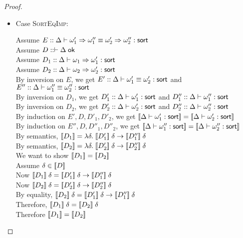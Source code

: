 \begin{proof}
\begin{itemize}
\item Case \textsc{SortEqImp}: 
  \begin{tabbedproof}
  \oo Assume $E :: {\Delta} \vdash {\omega'_1 \Rightarrow\omega''_1} \equiv {\omega'_2 \Rightarrow\omega''_2} : \mbox{\textsf{{sort}}}$ \\
  \oo Assume $D :: \vdash {\Delta} \;\mbox{\textsf{{ok}}}$ \\
  \oo Assume $D_1 :: {{\Delta}} \vdash {{\omega_1 \Rightarrow\omega'_1}} : {\mbox{\textsf{{sort}}}}$ \\
  \oo Assume $D_2 :: {{\Delta}} \vdash {{\omega_2 \Rightarrow\omega'_2}} : {\mbox{\textsf{{sort}}}}$ \\
  \ooo By inversion on $E$, we get 
         $E' :: {\Delta} \vdash {\omega'_1} \equiv {\omega'_2} : \mbox{\textsf{{sort}}}$ and 
         $E'' :: {\Delta} \vdash {\omega''_1} \equiv {\omega''_2} : \mbox{\textsf{{sort}}}$ \\
  \ooo By inversion on $D_1$, we get $D'_1 :: {{\Delta}} \vdash {{\omega'_1}} : {\mbox{\textsf{{sort}}}}$ 
                                 and $D''_1 :: {{\Delta}} \vdash {{\omega''_1}} : {\mbox{\textsf{{sort}}}}$ \\
  \ooo By inversion on $D_2$, we get $D'_2 :: {{\Delta}} \vdash {{\omega'_2}} : {\mbox{\textsf{{sort}}}}$ 
                                 and $D''_2 :: {{\Delta}} \vdash {{\omega''_2}} : {\mbox{\textsf{{sort}}}}$ \\
  \ooo By induction on $E', D, D'_1, D'_2$, we get 
             $[\![{{{\Delta}} \vdash {{\omega'_1}} : {\mbox{\textsf{{sort}}}}}]\!] = [\![{{{\Delta}} \vdash {{\omega'_2}} : {\mbox{\textsf{{sort}}}}}]\!]$ \\
  \ooo By induction on $E'', D, D''_1, D''_2$, we get 
             $[\![{{{\Delta}} \vdash {{\omega''_1}} : {\mbox{\textsf{{sort}}}}}]\!] = [\![{{{\Delta}} \vdash {{\omega''_2}} : {\mbox{\textsf{{sort}}}}}]\!]$ \\
  \ooo By semantics, $[\![{D_1}]\!] = \lambda \delta.\;[\![{D'_1}]\!]\;\delta \to 
                                                     [\![{D''_1}]\!]\;\delta$ \\
  \ooo By semantics, $[\![{D_2}]\!] = \lambda \delta.\;[\![{D'_2}]\!]\;\delta \to 
                                                     [\![{D''_2}]\!]\;\delta$ \\
  \ooo We want to show $[\![{D_1}]\!] = [\![{D_2}]\!]$ \\
  \ooo Assume $\delta \in [\![{D}]\!]$ \\
  \oooo Now $[\![{D_1}]\!]\;\delta = [\![{D'_1}]\!]\;\delta \to [\![{D''_1}]\!]\;\delta$ \\
  \oooo Now $[\![{D_2}]\!]\;\delta = [\![{D'_2}]\!]\;\delta \to [\![{D''_2}]\!]\;\delta$ \\
  \oooo By equality, $[\![{D_2}]\!]\;\delta = [\![{D'_1}]\!]\;\delta \to [\![{D''_1}]\!]\;\delta$ \\
  \oooo Therefore, $[\![{D_1}]\!]\;\delta = [\![{D_2}]\!]\;\delta$ \\
  \ooo Therefore $[\![{D_1}]\!] = [\![{D_2}]\!]$ \\
  \end{tabbedproof}


\end{itemize}
\end{proof}
